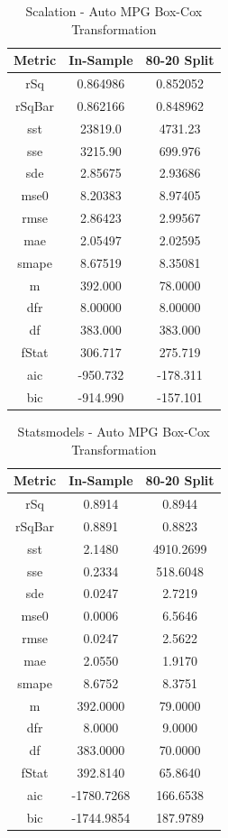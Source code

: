 \documentclass{article}
\begin{document}
\begin{table}[H]
\centering
\caption{Scalation - Auto MPG Box-Cox Transformation}
\label{tab:Scalation - Auto MPG Box-Cox Transformation}
\begin{tabular}{|c|c|c|} \hline 
Metric & In-Sample & 80-20 Split \\ \hline \hline 
rSq &0.864986 & 0.852052 \\ \hline 
rSqBar &0.862166 &      0.848962 \\ \hline 
sst &23819.0 &  4731.23 \\ \hline 
sse &3215.90 &  699.976 \\ \hline 
sde &2.85675 &  2.93686 \\ \hline 
mse0 &8.20383 & 8.97405 \\ \hline 
rmse &2.86423 & 2.99567 \\ \hline 
mae &2.05497 &  2.02595 \\ \hline 
smape &8.67519 &        8.35081 \\ \hline 
m &392.000 &    78.0000 \\ \hline 
dfr &8.00000 &  8.00000 \\ \hline 
df &383.000 &   383.000 \\ \hline 
fStat &306.717 &        275.719 \\ \hline 
aic &-950.732 & -178.311 \\ \hline 
bic &-914.990 & -157.101 \\ \hline 
\end{tabular}
\end{table}

\begin{table}[H]
\centering
\caption{Statsmodels - Auto MPG Box-Cox Transformation}
\label{tab:Statsmodels - Auto MPG Box-Cox Transformation}
\begin{tabular}{|c|c|c|}\hline
Metric & In-Sample & 80-20 Split \\ \hline \hline
rSq & 0.8914 & 0.8944 \\ \hline
rSqBar & 0.8891 & 0.8823 \\ \hline
sst & 2.1480 & 4910.2699 \\ \hline
sse & 0.2334 & 518.6048 \\ \hline
sde & 0.0247 & 2.7219 \\ \hline
mse0 & 0.0006 & 6.5646 \\ \hline
rmse & 0.0247 & 2.5622 \\ \hline
mae & 2.0550 & 1.9170 \\ \hline
smape & 8.6752 & 8.3751 \\ \hline
m & 392.0000 & 79.0000 \\ \hline
dfr & 8.0000 & 9.0000 \\ \hline
df & 383.0000 & 70.0000 \\ \hline
fStat & 392.8140 & 65.8640 \\ \hline
aic & -1780.7268 & 166.6538 \\ \hline
bic & -1744.9854 & 187.9789 \\ \hline
\end{tabular}
\end{table}
\end{document}
